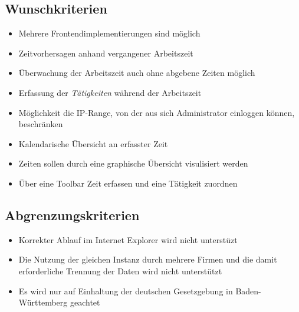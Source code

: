 \subsection{Wunschkriterien}

\begin{itemize}
	\item Mehrere Frontendimplementierungen sind möglich
	\item Zeitvorhersagen anhand vergangener Arbeitszeit
	\item Überwachung der Arbeitszeit auch ohne abgebene Zeiten möglich
	\item Erfassung der \emph{Tätigkeiten} während der Arbeitszeit
	\item Möglichkeit die IP-Range, von der aus sich Administrator einloggen können, beschränken
	\item Kalendarische Übersicht an erfasster Zeit
	\item Zeiten sollen durch eine graphische Übersicht visulisiert werden
	\item Über eine Toolbar Zeit erfassen und eine Tätigkeit zuordnen
\end{itemize}


\subsection{Abgrenzungskriterien}
\begin{itemize}
	\item Korrekter Ablauf im Internet Explorer wird nicht unterstüzt
	\item Die Nutzung der gleichen Instanz durch mehrere Firmen und die damit erforderliche Trennung der Daten wird nicht unterstützt
	\item Es wird nur auf Einhaltung der deutschen Gesetzgebung in Baden-Württemberg geachtet
\end{itemize}
